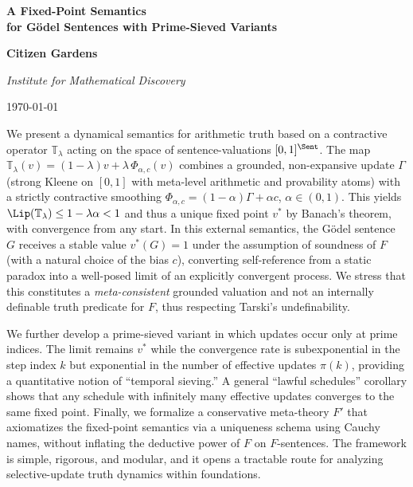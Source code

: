 \documentclass[12]{amsart}
\theoremstyle{plain}
\begin{document}
\begin{titlepage}
    \centering

    \vspace{0.5cm}
    {\LARGE\bfseries A Fixed-Point Semantics \\ for Gödel Sentences with Prime-Sieved Variants
    \par}

    \vspace{1cm}
     {\bfseries Citizen Gardens 
     \par}
     \vspace{0.5cm}
    \textit{Institute for Mathematical Discovery}
     \vspace{1cm}

    {\normalsize \today \par}

    \vfill

   
    \vspace{0.5em}
    \begin{minipage}{0.85\textwidth}
        \small
        We present a dynamical semantics for arithmetic truth based on a contractive operator $\mathbb{T}_\lambda$ acting on the space of sentence-valuations $[0,1]^{\Sent}$. The map $\mathbb{T}_\lambda(v)=(1-\lambda)v+\lambda\,\Phi_{\alpha,c}(v)$ combines a grounded, non-expansive update $\Gamma$ (strong Kleene on $[0,1]$ with meta-level arithmetic and provability atoms) with a strictly contractive smoothing $\Phi_{\alpha,c}=(1-\alpha)\Gamma+\alpha c$, $\alpha\in(0,1)$. This yields $\Lip(\mathbb{T}_\lambda)\le 1-\lambda\alpha<1$ and thus a unique fixed point $v^*$ by Banach's theorem, with convergence from any start. In this external semantics, the G\"odel sentence $G$ receives a stable value $v^*(G)=1$ under the assumption of soundness of $F$ (with a natural choice of the bias $c$), converting self-reference from a static paradox into a well-posed limit of an explicitly convergent process. We stress that this constitutes a \emph{meta-consistent} grounded valuation and not an internally definable truth predicate for $F$, thus respecting Tarski's undefinability.

We further develop a prime-sieved variant in which updates occur only at prime indices. The limit remains $v^*$ while the convergence rate is subexponential in the step index $k$ but exponential in the number of effective updates $\pi(k)$, providing a quantitative notion of ``temporal sieving.'' A general ``lawful schedules'' corollary shows that any schedule with infinitely many effective updates converges to the same fixed point. Finally, we formalize a conservative meta-theory $F'$ that axiomatizes the fixed-point semantics via a uniqueness schema using Cauchy names, without inflating the deductive power of $F$ on $F$-sentences. The framework is simple, rigorous, and modular, and it opens a tractable route for analyzing selective-update truth dynamics within foundations.



    \end{minipage}

\end{titlepage}
\end{document}
